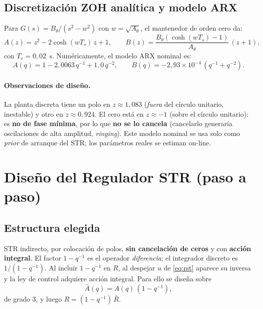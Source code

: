 \documentclass[a4paper,11pt]{report}
\begin{document}
\subsection{Discretización ZOH analítica y modelo ARX}

Para $G(s) = B_\theta/(s^2 - w^2)$ con $w = \sqrt{A_\theta}$, el mantenedor de
orden cero da:
\begin{equation}
  A(z) = z^2 - 2\cosh(w T_s)\, z + 1, \qquad
  B(z) = \frac{B_\theta(\cosh(w T_s) - 1)}{A_\theta}\,(z + 1),
\end{equation}
con $T_s = 0{,}02$~s. Numéricamente, el modelo ARX nominal es:
\begin{equation}
  A(q) = 1 - 2{,}0063\,q^{-1} + 1{,}0\,q^{-2}, \qquad
  B(q) = -2{,}93\!\times\!10^{-4}\,(q^{-1} + q^{-2}).
\end{equation}

\paragraph{Observaciones de diseño.} La planta discreta tiene un polo en
$z \approx 1{,}083$ (\emph{fuera} del círculo unitario, inestable) y otro en
$z \approx 0{,}924$. El cero está en $z \approx -1$ (sobre el círculo unitario):
es \textbf{no de fase mínima}, por lo que \textbf{no se lo cancela} (cancelarlo
generaría oscilaciones de alta amplitud, \emph{ringing}). Este modelo nominal se
usa solo como \emph{prior} de arranque del STR; los parámetros reales se estiman
on-line.

\section{Diseño del Regulador STR (paso a paso)}

\subsection{Estructura elegida}

STR indirecto, por colocación de polos, \textbf{sin cancelación de ceros} y con
\textbf{acción integral}. El factor $1-q^{-1}$ es el operador \emph{diferencia};
el integrador discreto es $1/(1-q^{-1})$. Al incluir $1-q^{-1}$ en $R$, al
despejar $u$ de \eqref{eq:rst} aparece su inversa y la ley de control adquiere
acción integral. Para ello se diseña sobre
\begin{equation}
  \bar A(q) = A(q)\,(1 - q^{-1}),
\end{equation}
de grado 3, y luego $R = (1-q^{-1})\,\bar R$.
\end{document}
